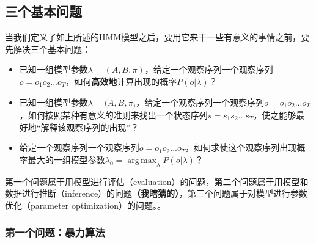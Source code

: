 \documentclass[11pt,a4paper]{article}
\DeclareMathOperator*{\argmax}{arg\,max}
\numberwithin{equation}{section}
\begin{document}
\subsection{三个基本问题}

当我们定义了如上所述的HMM模型之后，要用它来干一些有意义的事情之前，要先解决三个基本问题：
\begin{itemize}
\item 已知一组模型参数$\lambda = (A, B, \pi)$，给定一个观察序列一个观察序列$o=o_1 o_2 ... o_T$，如何\textbf{高效地}计算出现的概率$P(o | \lambda)$？
\item 已知一组模型参数$\lambda = (A, B, \pi_)$，给定一个观察序列一个观察序列$o=o_1 o_2 ... o_T$，如何按照某种有意义的准则来找出一个状态序列$s = s_1 s_2 ... s_T$，使之能够最好地“解释该观察序列的出现”？
\item 给定一个观察序列一个观察序列$o=o_1 o_2 ... o_T$，如何求使这个观察序列出现概率最大的一组模型参数$\lambda_0 = \argmax_{\lambda} P(o | \lambda) $？
\end{itemize}
第一个问题属于用模型进行评估（evaluation）的问题，第二个问题属于用模型和数据进行推断（inference）的问题\textbf{（我瞎猜的）}，第三个问题属于对模型进行参数优化（parameter optimization）的问题。。

\subsubsection{第一个问题：暴力算法}
\end{document}
